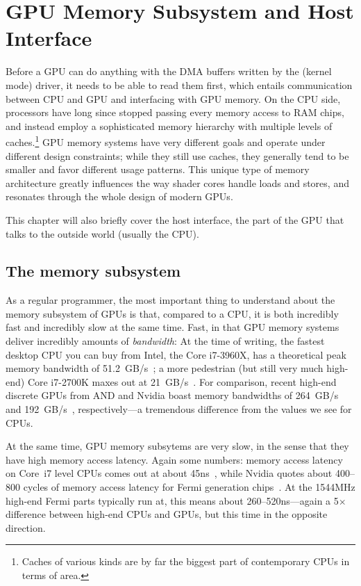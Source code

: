 \chapter{GPU Memory Subsystem and Host Interface}
\label{ch:memory}


Before a GPU can do anything with the DMA buffers written by the (kernel mode) driver,
it needs to be able to read them first, which entails communication between CPU and GPU
and interfacing with GPU memory. On the CPU side, processors have long since stopped
passing every memory access to RAM chips, and instead employ a sophisticated memory
hierarchy with multiple levels of caches.\footnote{Caches of various kinds are by far
the biggest part of contemporary CPUs in terms of area.} GPU memory systems have very
different goals and operate under different design constraints; while they still use
caches, they generally tend to be smaller and favor different usage patterns. This unique
type of memory architecture greatly influences the way shader cores handle loads and stores,
and resonates through the whole design of modern GPUs.

This chapter will also briefly cover the host interface, the part of the GPU that talks
to the outside world (usually the CPU).

\section{The memory subsystem}

As a regular programmer, the most important thing to understand about the memory
subsystem of GPUs is that, compared to a CPU, it is both incredibly fast and incredibly
slow at the same time. Fast, in that GPU memory systems deliver incredibly amounts of
\emph{bandwidth}: At the time of writing, the fastest desktop CPU you can buy from Intel,
the Core i7-3960X, has a theoretical peak memory bandwidth of 51.2~GB/s~\citep{membw-i7-3960x};
a more pedestrian (but still very much high-end) Core i7-2700K maxes out at 21~GB/s~\citep{membw-i7-2700k}.
For comparison, recent high-end discrete GPUs from AND and Nvidia boast memory bandwidths of
264~GB/s~\citep{membw-radeonhd-7970} and 192~GB/s~\citep{membw-geforce-gtx680}, respectively---a
tremendous difference from the values we see for CPUs.

At the same time, GPU memory subsytems are very slow, in the sense that they have high
memory access latency. Again some numbers: memory access latency on Core~i7 level CPUs comes
out at about 45ns~\citep{memlat-i7}, while Nvidia quotes about 400--800 cycles of memory access
latency for Fermi generation chips~\citep{memlat-nvidia}. At the 1544MHz high-end Fermi parts
typically run at, this means about 260--520ns---again a 5$\times$ difference between high-end
CPUs and GPUs, but this time in the opposite direction.

